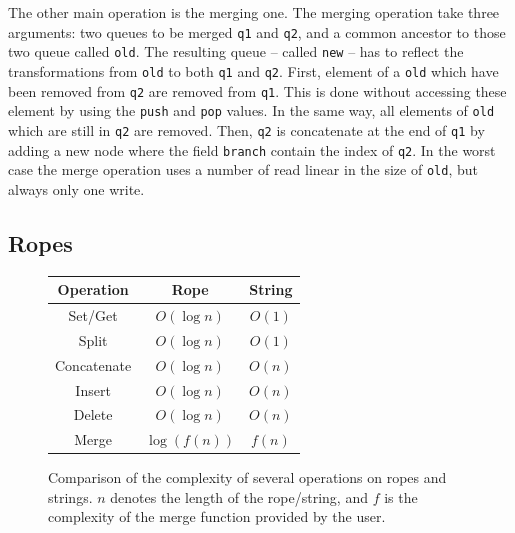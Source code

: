 \documentclass{article}
\renewcommand{\-}{\hyp}
\newcommand{\code}[1]{\texttt{#1}}
\begin{document}
The other main operation is the merging one.
The merging operation take three arguments: two queues to be merged \code{q1} and \code{q2}, and a common ancestor to those two queue called \code{old}.
The resulting queue -- called \code{new} -- has to reflect the transformations from \code{old} to both \code{q1} and \code{q2}. First, element of a \code{old} which have been removed from \code{q2} are removed from \code{q1}. This is done without accessing these element by using the \code{push} and \code{pop} values. In the same way, all elements of \code{old} which are still in \code{q2} are removed. Then, \code{q2} is concatenate at the end of \code{q1} by adding a new node where the field \code{branch} contain the index of \code{q2}. In the worst case the merge operation uses a number of read linear in the size of \code{old}, but always only one write.



\subsection{Ropes}

\begin{figure}[hbt]
\centering
\setlength{\tabcolsep}{1cm}
\begin{tabular}{|c|c|c|}
\hline
	Operation &
	Rope &
	String \\
\hline
	Set/Get &
	\cellcolor{butter!20} $O(\log n)$ &
	\cellcolor{chameleon!20} $O(1)$ \\
\hline
	Split &
	\cellcolor{butter!20} $O(\log n)$ &
	\cellcolor{chameleon!20} $O(1)$ \\
\hline
	Concatenate &
	\cellcolor{butter!20} $O(\log n)$ &
	\cellcolor{scarletred!20} $O(n)$ \\
\hline
	Insert &
	\cellcolor{butter!20} $O(\log n)$ &
	\cellcolor{scarletred!20} $O(n)$ \\
\hline
	Delete &
	\cellcolor{butter!20} $O(\log n)$ &
	\cellcolor{scarletred!20} $O(n)$ \\
\hline
\hline
	Merge &
	\cellcolor{chameleon!20} $\log\left(f(n)\right)$ &
	\cellcolor{butter!20} $f(n)$ \\
\hline
\end{tabular}
\caption{Comparison of the complexity of several operations on ropes and strings. $n$ denotes the length of the rope/string, and $f$ is the complexity of the merge function provided by the user.}
\label{complexitytable}
\end{figure}
\end{document}
